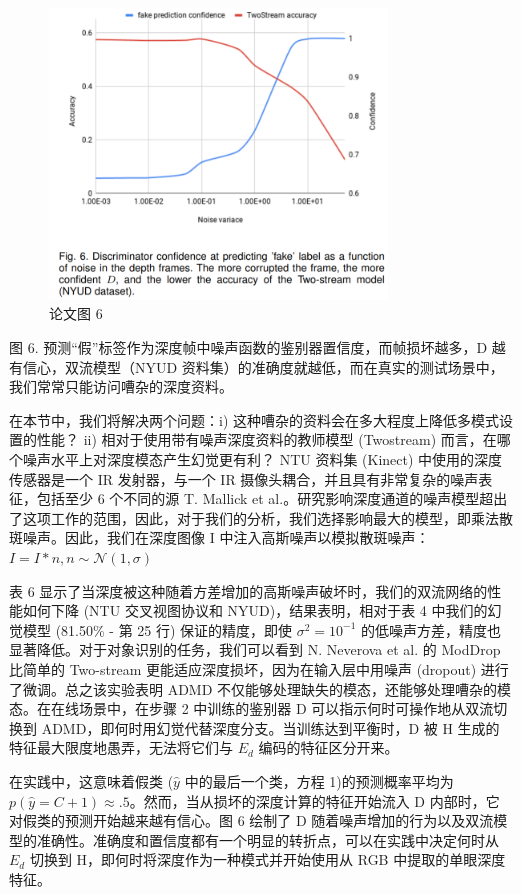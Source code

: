 \begin{figure}[htb]
\centering 
\includegraphics[width=0.80\textwidth]{img/c1m10.png} 
\caption{论文图 6}
\label{Test}
\end{figure}

图 6. 预测“假”标签作为深度帧中噪声函数的鉴别器置信度，而帧损坏越多，D 越有信心，双流模型（NYUD 资料集）的准确度就越低，而在真实的测试场景中，我们常常只能访问嘈杂的深度资料。

在本节中，我们将解决两个问题：i) 这种嘈杂的资料会在多大程度上降低多模式设置的性能？ ii) 相对于使用带有噪声深度资料的教师模型 (Twostream) 而言，在哪个噪声水平上对深度模态产生幻觉更有利？
NTU 资料集 (Kinect) 中使用的深度传感器是一个 IR 发射器，与一个 IR 摄像头耦合，并且具有非常复杂的噪声表征，包括至少 6 个不同的源 T. Mallick et al.。研究影响深度通道的噪声模型超出了这项工作的范围，因此，对于我们的分析，我们选择影响最大的模型，即乘法散斑噪声。因此，我们在深度图像 I 中注入高斯噪声以模拟散斑噪声： $I=I * n, n \sim \mathcal{N}(1, \sigma)$

表 6 显示了当深度被这种随着方差增加的高斯噪声破坏时，我们的双流网络的性能如何下降 (NTU 交叉视图协议和 NYUD)，结果表明，相对于表 4 中我们的幻觉模型 (81.50\% - 第 25 行) 保证的精度，即使 $\sigma^{2}=10^{-1}$ 的低噪声方差，精度也显著降低。对于对象识别的任务，我们可以看到 N. Neverova et al. 的 ModDrop 比简单的 Two-stream 更能适应深度损坏，因为在输入层中用噪声 (dropout) 进行了微调。总之该实验表明 ADMD 不仅能够处理缺失的模态，还能够处理嘈杂的模态。在在线场景中，在步骤 2 中训练的鉴别器 D 可以指示何时可操作地从双流切换到 ADMD，即何时用幻觉代替深度分支。当训练达到平衡时，D 被 H 生成的特征最大限度地愚弄，无法将它们与 $E_{d}$ 编码的特征区分开来。

在实践中，这意味着假类 ($\hat{y}$ 中的最后一个类，方程 1)的预测概率平均为 $p(\hat{y}=C+1) \approx .5$。然而，当从损坏的深度计算的特征开始流入 D 内部时，它对假类的预测开始越来越有信心。图 6 绘制了 D 随着噪声增加的行为以及双流模型的准确性。准确度和置信度都有一个明显的转折点，可以在实践中决定何时从 $E_{d}$ 切换到 H，即何时将深度作为一种模式并开始使用从 RGB 中提取的单眼深度特征。

